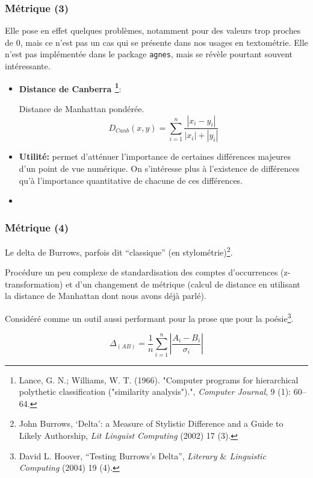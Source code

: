 \documentclass{beamer}
\begin{document}
\begin{frame}[fragile]
\frametitle{Métrique (3)}

Elle pose en effet quelques problèmes, notamment pour des valeurs trop proches de 0, mais ce n'est pas un cas qui se présente dans nos usages en textométrie. Elle n'est pas implémentée dans le package \texttt{agnes}, mais se révèle pourtant souvent intéressante.

\begin{itemize}
\item \textbf{Distance de Canberra \footnote{Lance, G. N.; Williams, W. T. (1966). "Computer programs for hierarchical polythetic classification ("similarity analysis").", \textit{Computer Journal}, 9 (1): 60–64. }}:

Distance de Manhattan pondérée.
\[
D_{Canb} (x,y) = \sum_{i=1}^{n} \frac{|x_{i}-y_{i}|}{|x_{i}|+|y_{i}|}
\]

\item \textbf{Utilité:} permet d'atténuer l'importance de certaines différences majeures d'un point de vue numérique. On s'intéresse plus à l'existence de différences qu'à l'importance quantitative de chacune de ces différences.

\item 
\end{itemize}




\end{frame}


\begin{frame}[fragile]
\frametitle{Métrique (4)}

Le delta de Burrows, parfois dit ``classique'' (en stylométrie)\footnote{%
John Burrows, ‘Delta’: a Measure of Stylistic Difference and a Guide to Likely Authorship, \textit{Lit Linguist Computing} (2002) 17 (3).
}.

Procédure un peu complexe de standardisation des comptes d'occurrences (z-transformation) et d'un changement de métrique (calcul de distance en utilisant la distance de Manhattan dont nous avons déjà parlé).

Considéré comme un outil aussi performant pour la prose que pour la poésie\footnote{%
David L. Hoover, ``Testing Burrows's Delta'', \textit{Literary $\&$ Linguistic Computing} (2004) 19 (4).
}.

\[
\Delta_{(AB)} = \frac{1}{n} \sum\limits_{i=1}^{n}
\left| \frac{A_i - B_i}{\sigma_i} \right|
\]


\end{frame}
\end{document}
